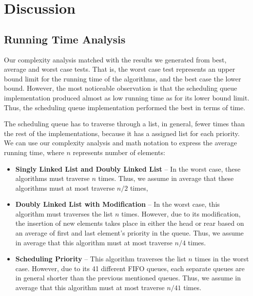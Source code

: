 \documentclass[a4paper,11pt]{kth-mag}
\newcommand*{\skippara}{\par\vspace{\baselineskip} \noindent}
\begin{document}
\section{Discussion}
\subsection{Running Time Analysis}
Our complexity analysis matched with the results we generated from best, average and worst case tests.
That is, the worst case test represents an upper bound limit for the running time of the algorithms, and the best case the lower bound.
However, the most noticeable observation is that the scheduling queue implementation produced almost as low running time as for its lower bound limit.
Thus, the scheduling queue implementation performed the best in terms of time.

\skippara The scheduling queue has to traverse through a list, in general, fewer times than the rest of the implementations, because it has a assigned list for each priority.
We can use our complexity analysis and math notation to express the average running time, where $n$ represents number of elements:
\begin{itemize}
    \item \textbf{Singly Linked List and Doubly Linked List} -- In the worst case, these algorithms must traverse $n$ times.
        Thus, we assume in average that these algorithms must at most traverse $n/2$ times,
    \item \textbf{Doubly Linked List with Modification} -- In the worst case, this algorithm must traverses the list $n$ times.
        However, due to its modification, the insertion of new elements takes place in either the head or rear based on an average of first and last element's priority in the queue.
        Thus, we assume in average that this algorithm must at most traverse $n/4$ times.
    \item \textbf{Scheduling Priority} -- This algorithm traverses the list $n$ times in the worst case.
        However, due to its 41 different FIFO queues, each separate queues are in general shorter than the previous mentioned queues.
        Thus, we assume in average that this algorithm must at most traverse $n/41$ times.
\end{itemize}
\end{document}
